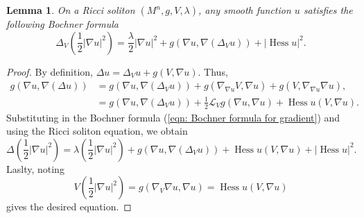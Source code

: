 \documentclass{amsart}
\newcommand{\abs}[1]{\left| #1 \right|}
\newcommand{\lie}[1]{\mathcal{L}_{#1}}
\newcommand{\brackets}[1]{\left( #1 \right)}
\DeclareMathOperator*{\hessian}{Hess}
\theoremstyle{plain}
\theoremstyle{plain}
\theoremstyle{plain}
\theoremstyle{plain}
\newtheorem{lemma}{Lemma}
\theoremstyle{remark}
\begin{document}
\begin{lemma}\label{lem: Bochner formula w.r.t. Delta V}
    On a Ricci soliton $(M^n,g,V,\lambda)$, any smooth function $u$ satisfies the following Bochner formula
    \begin{equation}\label{eqn: Bochner formula w.r.t. Delta V}
        \Delta_V \brackets{\frac{1}{2} \abs{\nabla u}^2} = \frac{\lambda}{2} \abs{\nabla u}^2 
            + g\brackets{ \nabla u , \nabla ( \Delta_V u) } + \abs{\hessian u}^2 .
    \end{equation}
\end{lemma}
\begin{proof}
    By definition, $\Delta u = \Delta_V u + g(V, \nabla u) $.
    Thus,
    \begin{align*}
        g\brackets{ \nabla u , \nabla ( \Delta u) } 
            &= g\brackets{ \nabla u , \nabla ( \Delta_V u) }  
                + g\brackets{ \nabla_{\nabla u} V , \nabla u } + g (V, \nabla_{\nabla u} \nabla u) , \\
            &= g\brackets{ \nabla u , \nabla ( \Delta_V u) } 
                + \frac{1}{2} \lie{V}g (\nabla u, \nabla u) + \hessian u (V, \nabla u).
    \end{align*}
    Substituting in the Bochner formula (\cref{eqn: Bochner formula for gradient})
    and using the Ricci soliton equation, we  obtain
    \begin{equation*}
        \Delta \brackets{\frac{1}{2} \abs{\nabla u}^2} 
            = \lambda \brackets{ \frac{1}{2} \abs{\nabla u}^2 } + g\brackets{ \nabla u , \nabla ( \Delta_V u) } 
                + \hessian u (V, \nabla u) + \abs{ \hessian u}^2 .
    \end{equation*}
    Laslty, noting 
    $$ V \brackets{\frac{1}{2} \abs{\nabla u}^2} = g\brackets{ \nabla_V \nabla u,\nabla u } = \hessian u (V, \nabla u)  $$
    gives the desired equation.
\end{proof}
\end{document}
